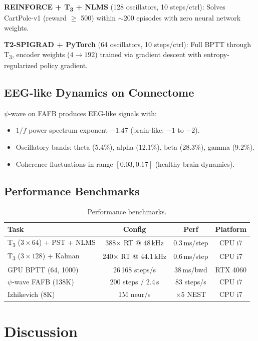 \documentclass[twocolumn,10pt]{article}
\newcommand{\Tthree}{T\textsubscript{3}}
\newcommand{\psiwave}{$\psi$-wave}
\begin{document}
\textbf{REINFORCE + \Tthree{} + NLMS} (128 oscillators, 10 steps/ctrl): Solves CartPole-v1 (reward $\ge$ 500) within $\sim$200 episodes with zero neural network weights.

\textbf{T2-SPIGRAD + PyTorch} (64 oscillators, 10 steps/ctrl): Full BPTT through \Tthree{}, encoder weights ($4\rightarrow192$) trained via gradient descent with entropy-regularized policy gradient.

\subsection{EEG-like Dynamics on Connectome}

\psiwave{} on FAFB produces EEG-like signals with:
\begin{itemize}
  \item $1/f$ power spectrum exponent $-1.47$ (brain-like: $-1$ to $-2$).
  \item Oscillatory bands: theta (5.4\%), alpha (12.1\%), beta (28.3\%), gamma (9.2\%).
  \item Coherence fluctuations in range $[0.03, 0.17]$ (healthy brain dynamics).
\end{itemize}

\subsection{Performance Benchmarks}

\begin{table}[h]
\centering
\caption{Performance benchmarks.}
\begin{tabular}{lccc}
\toprule
Task & Config & Perf & Platform \\
\midrule
\Tthree{} ($3\times64$) + PST + NLMS & 388$\times$ RT @ 48\,kHz & 0.3\,ms/step & CPU i7 \\
\Tthree{} ($3\times128$) + Kalman & 240$\times$ RT @ 44.1\,kHz & 0.6\,ms/step & CPU i7 \\
GPU BPTT (64, 1000) & 26\,168 steps/s & 38\,ms/bwd & RTX 4060 \\
\psiwave{} FAFB (138K) & 200 steps / 2.4\,s & 83 steps/s & CPU i7 \\
Izhikevich (8K) & 1M neur/s & $\times$5 NEST & CPU i7 \\
\bottomrule
\end{tabular}
\end{table}

\section{Discussion}
\end{document}
